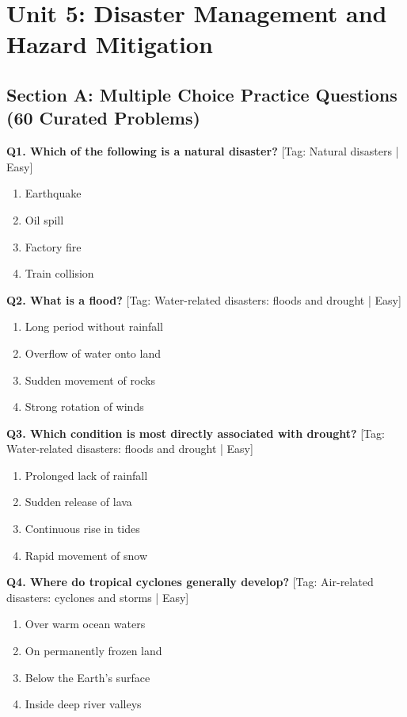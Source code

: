 \chapter{Unit 5: Disaster Management and Hazard Mitigation}

\section{Section A: Multiple Choice Practice Questions (60 Curated Problems)}

\noindent\textbf{Q1. Which of the following is a natural disaster?} \hfill [Tag: Natural disasters | Easy]
\begin{enumerate}[label=(\alph*),topsep=2pt,itemsep=1pt,partopsep=0pt,parsep=0pt]
    \item {Earthquake}
    \item {Oil spill}
    \item {Factory fire}
    \item {Train collision}
\end{enumerate}
\vspace{2mm}

\noindent\textbf{Q2. What is a flood?} \hfill [Tag: Water-related disasters: floods and drought | Easy]
\begin{enumerate}[label=(\alph*),topsep=2pt,itemsep=1pt,partopsep=0pt,parsep=0pt]
    \item {Long period without rainfall}
    \item {Overflow of water onto land}
    \item {Sudden movement of rocks}
    \item {Strong rotation of winds}
\end{enumerate}
\vspace{2mm}

\noindent\textbf{Q3. Which condition is most directly associated with drought?} \hfill [Tag: Water-related disasters: floods and drought | Easy]
\begin{enumerate}[label=(\alph*),topsep=2pt,itemsep=1pt,partopsep=0pt,parsep=0pt]
    \item {Prolonged lack of rainfall}
    \item {Sudden release of lava}
    \item {Continuous rise in tides}
    \item {Rapid movement of snow}
\end{enumerate}
\vspace{2mm}

\noindent\textbf{Q4. Where do tropical cyclones generally develop?} \hfill [Tag: Air-related disasters: cyclones and storms | Easy]
\begin{enumerate}[label=(\alph*),topsep=2pt,itemsep=1pt,partopsep=0pt,parsep=0pt]
    \item {Over warm ocean waters}
    \item {On permanently frozen land}
    \item {Below the Earth's surface}
    \item {Inside deep river valleys}
\end{enumerate}
\vspace{2mm}

